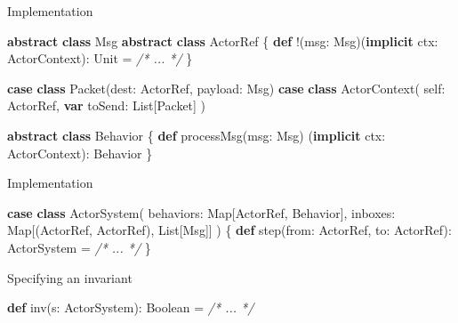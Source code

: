 \documentclass[ignorenonframetext,]{beamer}
\newenvironment{Shaded}{}{}
\newcommand{\CommentTok}[1]{\textcolor[rgb]{0.38,0.63,0.69}{\textit{#1}}}
\newcommand{\FunctionTok}[1]{\textcolor[rgb]{0.02,0.16,0.49}{#1}}
\newcommand{\KeywordTok}[1]{\textcolor[rgb]{0.00,0.44,0.13}{\textbf{#1}}}
\newcommand{\NormalTok}[1]{#1}
\begin{document}
\begin{frame}[fragile]{%
\protect\hypertarget{implementation-1}{%
Implementation}}

\begin{Shaded}
\begin{Highlighting}[]
\KeywordTok{abstract} \KeywordTok{class}\NormalTok{ Msg}
\KeywordTok{abstract} \KeywordTok{class}\NormalTok{ ActorRef \{}
  \KeywordTok{def}\NormalTok{ !(msg: Msg)(}\KeywordTok{implicit}\NormalTok{ ctx: ActorContext): Unit = }\CommentTok{/* ... */}
\NormalTok{\}}

\KeywordTok{case} \KeywordTok{class} \FunctionTok{Packet}\NormalTok{(dest: ActorRef, payload: Msg)}
\KeywordTok{case} \KeywordTok{class} \FunctionTok{ActorContext}\NormalTok{(}
\NormalTok{  self: ActorRef,}
  \KeywordTok{var}\NormalTok{ toSend: List[Packet]}
\NormalTok{)}

\KeywordTok{abstract} \KeywordTok{class}\NormalTok{ Behavior \{}
  \KeywordTok{def} \FunctionTok{processMsg}\NormalTok{(msg: Msg)}
\NormalTok{                (}\KeywordTok{implicit}\NormalTok{ ctx: ActorContext): Behavior}
\NormalTok{\}}
\end{Highlighting}
\end{Shaded}

\end{frame}

\begin{frame}[fragile]{%
\protect\hypertarget{implementation-2}{%
Implementation}}

\begin{Shaded}
\begin{Highlighting}[]
\KeywordTok{case} \KeywordTok{class} \FunctionTok{ActorSystem}\NormalTok{(}
\NormalTok{  behaviors: Map[ActorRef, Behavior],}
\NormalTok{  inboxes: Map[(ActorRef, ActorRef), List[Msg]]}
\NormalTok{) \{}
  \KeywordTok{def} \FunctionTok{step}\NormalTok{(from: ActorRef, to: ActorRef): ActorSystem = }\CommentTok{/* ... */}
\NormalTok{\}}
\end{Highlighting}
\end{Shaded}

\end{frame}

\begin{frame}[fragile]{%
\protect\hypertarget{specifying-an-invariant}{%
Specifying an invariant}}

\begin{Shaded}
\begin{Highlighting}[]
\KeywordTok{def} \FunctionTok{inv}\NormalTok{(s: ActorSystem): Boolean = }\CommentTok{/* ... */}
\end{Highlighting}
\end{Shaded}

\end{frame}
\end{document}
